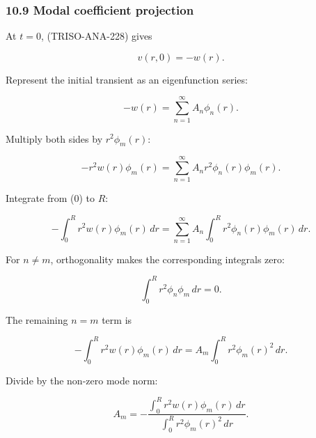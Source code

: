 \documentclass[11pt,a4paper]{article}
\begin{document}
\subsubsection*{10.9 Modal coefficient projection}

At $t=0$, (TRISO-ANA-228) gives

\begin{equation}
v(r,0)=-w(r).
\tag{TRISO-SL-226}
\label{eq:triso-sl-226}
\end{equation}

Represent the initial transient as an eigenfunction series:

\begin{equation}
-w(r)
=
\sum_{n=1}^{\infty}
A_n\phi_n(r).
\tag{TRISO-SL-227}
\label{eq:triso-sl-227}
\end{equation}

Multiply both sides by $r^2\phi_m(r)$:

\begin{equation}
-r^2w(r)\phi_m(r)
=
\sum_{n=1}^{\infty}
A_n r^2\phi_n(r)\phi_m(r).
\tag{TRISO-SL-228}
\label{eq:triso-sl-228}
\end{equation}

Integrate from (0) to $R$:

\begin{equation}
-\int_0^R
r^2w(r)\phi_m(r)\,dr
=
\sum_{n=1}^{\infty}
A_n
\int_0^R
r^2\phi_n(r)\phi_m(r)\,dr.
\tag{TRISO-SL-229}
\label{eq:triso-sl-229}
\end{equation}

For $n\ne m$, orthogonality makes the corresponding integrals zero:

\begin{equation}
\int_0^R
r^2\phi_n\phi_m\,dr
=
0.
\tag{TRISO-SL-230}
\label{eq:triso-sl-230}
\end{equation}

The remaining $n=m$ term is

\begin{equation}
-\int_0^R
r^2w(r)\phi_m(r)\,dr
=
A_m
\int_0^R
r^2\phi_m(r)^2\,dr.
\tag{TRISO-SL-231}
\label{eq:triso-sl-231}
\end{equation}

Divide by the non-zero mode norm:

\begin{equation}
\boxed{
A_m
=
-
\frac{
\int_0^R
r^2w(r)\phi_m(r)\,dr
}{
\int_0^R
r^2\phi_m(r)^2\,dr
}.
}
\tag{TRISO-SL-232}
\label{eq:triso-sl-232}
\end{equation}
\end{document}
